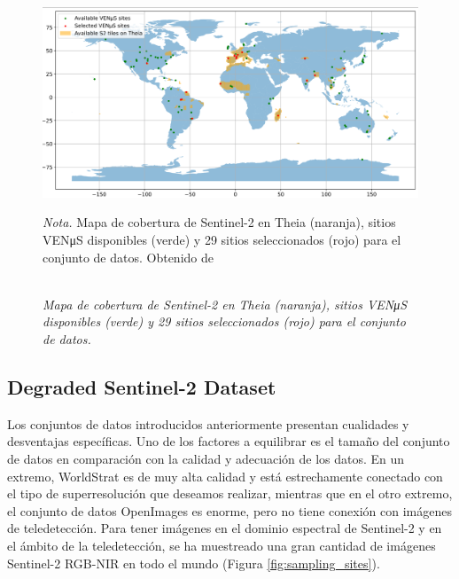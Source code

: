 \begin{figure}[H] 
    \caption{\doublespacing \\ \textit{Mapa de cobertura de Sentinel-2 en Theia (naranja), sitios VENμS disponibles (verde) y 29 sitios seleccionados (rojo) para el conjunto de datos.}} 
    \centering
    \includegraphics[width=1\linewidth]{images/csaybar_fig06.png}
    \begin{justify}
        \textit{Nota.} Mapa de cobertura de Sentinel-2 en Theia (naranja), sitios VENμS disponibles (verde) y 29 sitios seleccionados (rojo) para el conjunto de datos. Obtenido de \textcite{michel2022sen2venmus}
    \end{justify}                    
    \label{fig:sen2venus}
\end{figure}

\subsection{Degraded Sentinel-2 Dataset}
Los conjuntos de datos introducidos anteriormente presentan cualidades y desventajas específicas. Uno de los factores a equilibrar es el tamaño del conjunto de datos en comparación con la calidad y adecuación de los datos. En un extremo, WorldStrat es de muy alta calidad y está estrechamente conectado con el tipo de superresolución que deseamos realizar, mientras que en el otro extremo, el conjunto de datos OpenImages es enorme, pero no tiene conexión con imágenes de teledetección. Para tener imágenes en el dominio espectral de Sentinel-2 y en el ámbito de la teledetección, se ha muestreado una gran cantidad de imágenes Sentinel-2 RGB-NIR en todo el mundo (Figura \ref{fig:sampling_sites}).

